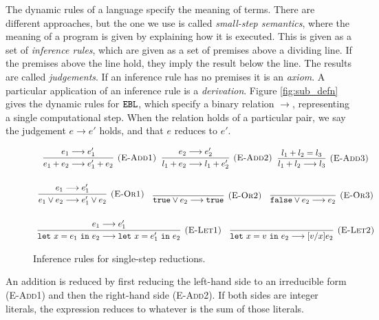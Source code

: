 The dynamic rules of a language specify the meaning of terms. There are different approaches, but the one we use is called \textit{small-step semantics}, where the meaning of a program is given by explaining how it is executed. This is given as a set of \textit{inference rules}, which are given as a set of premises above a dividing line. If the premises above the line hold, they imply the result below the line. The results are called \textit{judgements}. If an inference rule has no premises it is an \textit{axiom}. A particular application of an inference rule is a \textit{derivation}. Figure \ref{fig:sub_defn} gives the dynamic rules for $\mathtt{EBL}$, which specify a binary relation $\longrightarrow$, representing a single computational step. When the relation holds of a particular pair, we say the judgement $e \longrightarrow e'$ holds, and that $e$ reduces to $e'$. 

\begin{figure}[h]

\noindent
{}

\[
\begin{array}{c}

\infer[\textsc{(E-Add1)}]
	{e_1 + e_2 \longrightarrow e_1' + e_2}
	{e_1 \longrightarrow e_1'}
~~
\infer[\textsc{(E-Add2)}]
	{l_1 + e_2 \longrightarrow l_1 + e_2'}
	{e_2 \longrightarrow e_2'}
~~
\infer[\textsc{(E-Add3)}]
	{l_1 + l_2 \longrightarrow l_3}
	{l_1 + l_2 = l_3} \\[4ex]

\infer[\textsc{(E-Or1)}]
	{e_1 \lor e_2 \longrightarrow e_1' \lor e_2}
	{e_1 \longrightarrow e_1'}
	~~~
\infer[\textsc{(E-Or2)}]
	{\true \lor e_2 \longrightarrow \true}
	{}
	~~~
\infer[\textsc{(E-Or3)}]
	{\false \lor e_2 \longrightarrow e_2}
	{}\\[4ex]
	
\infer[\textsc{(E-Let1)}]
	{\letxpr{x}{e_1}{e_2} \longrightarrow \letxpr{x}{e_1'}{e_2}}
	{e_1 \longrightarrow e_1'}
	~~~
\infer[\textsc{(E-Let2)}]
	{\letxpr{x}{v}{e_2} \longrightarrow [v/x]e_2}
	{}

\end{array}
\]

\vspace{-12pt}
\caption{Inference rules for single-step reductions.}
\label{fig:ebl_dynamic}
\end{figure}

An addition is reduced by first reducing the left-hand side to an irreducible form (\textsc{E-Add1}) and then the right-hand side (\textsc{E-Add2}). If both sides are integer literals, the expression reduces to whatever is the sum of those literals.

